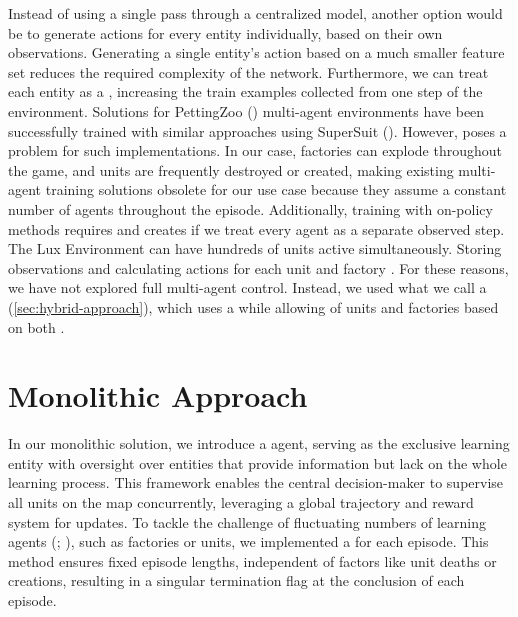\bigskip

\noindent Instead of using a single pass through a centralized model, another option would be to generate actions for every entity individually, based on their own observations. Generating a single entity's action based on a much smaller feature set reduces the required complexity of the network. Furthermore, we can treat each entity as a , increasing the train examples collected from one step of the environment. Solutions for PettingZoo ({\cite{terry2021pettingzoo}}) multi-agent environments have been successfully trained with similar approaches using SuperSuit (\cite{SuperSuit}). However,  poses a problem for such implementations. In our case, factories can explode throughout the game, and units are frequently destroyed or created, making existing multi-agent training solutions obsolete for our use case because they assume a constant number of agents throughout the episode. Additionally, training with on-policy methods requires  and creates  if we treat every agent as a separate observed step. The Lux Environment can have hundreds of units active simultaneously. Storing observations and calculating actions for each unit and factory . For these reasons, we have not explored full multi-agent control. Instead, we used what we call a  (\autoref{sec:hybrid-approach}), which uses a  while allowing  of units and factories based on both .

\section{Monolithic Approach}
\label{sec:monolithic-approach}

\noindent In our monolithic solution, we introduce a  agent, serving as the exclusive learning entity with oversight over entities that provide information but lack  on the whole learning process. This framework enables the central decision-maker to supervise all units on the map concurrently, leveraging a global trajectory and reward system for updates. To tackle the challenge of fluctuating numbers of learning agents (\cite{piccoli2023control}; \cite{SuperSuit}), such as factories or units, we implemented a  for each episode. This method ensures fixed episode lengths, independent of factors like unit deaths or creations, resulting in a singular termination flag at the conclusion of each episode.

